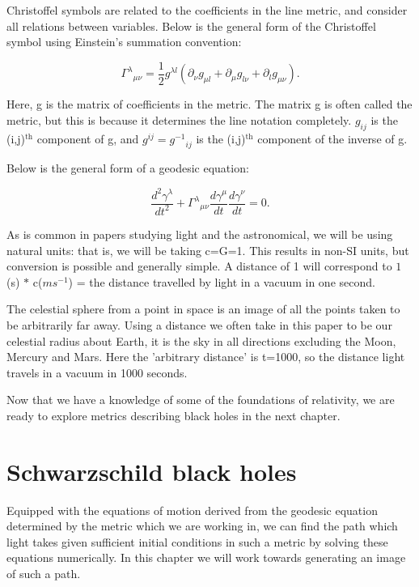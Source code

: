 \documentclass[oneside,openright,frontopenright, singlespacing]{dmathesis}
\begin{document}
\vspace{1em}
	Christoffel symbols are related to the coefficients in the line metric, and consider all relations between variables. Below is the general form of the Christoffel symbol using Einstein's summation convention:
	
	\[{\Gamma^\lambda}_{\mu\nu} = \frac{1}{2}g^{\lambda{l}}(\partial_{\nu}g_{\mu{l}} + \partial_{\mu}g_{l\nu} + \partial_{l}g_{\mu\nu}).\]
	
	Here, g is the matrix of coefficients in the metric. The matrix g is often called the metric, but this is because it determines the line notation completely. $g_{ij}$ is the (i,j)$^{\mbox{th}}$ component of g, and $g^{ij}={g^{-1}}_{ij}$ is the (i,j)$^{\mbox{th}}$ component of the inverse of g.

\vspace{1em}
	Below is the general form of a geodesic equation\cite[pp. 156-157]{schutz2009first}:

	\[\frac{d^2 \gamma^\lambda}{dt^2} + {\Gamma^\lambda}_{\mu\nu} \frac{d\gamma^\mu}{dt} \frac{d\gamma^\nu}{dt} = 0.\]

	As is common in papers studying light and the astronomical, we will be using natural units: that is, we will be taking c=G=1. This results in non-SI units, but conversion is possible and generally simple. A distance of 1 will correspond to $1$(s) $*$ c($ms^{-1}$) = the distance travelled by light in a vacuum in one second.

\vspace{1em}
	The celestial sphere from a point in space is an image of all the points taken to be arbitrarily far away. Using a distance we often take in this paper to be our celestial radius about Earth, it is the sky in all directions excluding the Moon, Mercury and Mars. Here the 'arbitrary distance' is t=1000, so the distance light travels in a vacuum in 1000 seconds.

\vspace{1em}
	Now that we have a knowledge of some of the foundations of relativity, we are ready to explore metrics describing black holes in the next chapter.






\chapter{Schwarzschild black holes}\label{chap:Chapter3}

	Equipped with the equations of motion derived from the geodesic equation determined by the metric which we are working in, we can find the path which light takes given sufficient initial conditions in such a metric by solving these equations numerically. In this chapter we will work towards generating an image of such a path.
\end{document}
